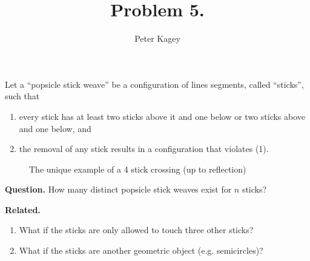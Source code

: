 \documentclass{article}
\newenvironment{question}{\begin{trivlist}\item[\textbf{Question.}]}{\end{trivlist}}
\newenvironment{related}{\begin{trivlist}\item[\textbf{Related.}]\end{trivlist}\begin{enumerate}}{\end{enumerate}}
\begin{document}
\title{Problem 5.}
\date{}
\author{Peter Kagey}
\maketitle

  Let a ``popsicle stick weave'' be a configuration of lines segments, called ``sticks'', such that
  \begin{enumerate}[(1)]
    \item every stick has at least two sticks above it and one below or
      two sticks above and one below, and
    \item the removal of any stick results in a configuration that violates (1).
  \end{enumerate}

\begin{figure}[!h]
  \centering
  \caption{The unique example of a 4 stick crossing (up to reflection)}
\end{figure}

\begin{question}
  How many distinct popsicle stick weaves exist for $n$ sticks?
\end{question}

\begin{related}
  \item What if the sticks are only allowed to touch three other sticks?
  \item What if the sticks are another geometric object (e.g. semicircles)?
\end{related}
\end{document}
